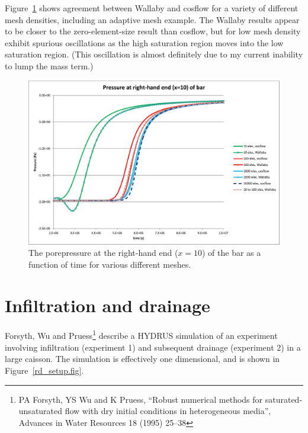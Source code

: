 \documentclass[]{scrreprt}
\begin{document}
Figure~\ref{uf.result.fig} shows agreement between Wallaby and
cosflow for a variety of different mesh densities, including an
adaptive mesh example.  The Wallaby results appear to be closer to the
zero-element-size result than cosflow, but for low mesh density
exhibit spurious oscillations as the high saturation region moves into
the low saturation region.  (This oscillation is almost definitely due
to my current inability to lump the mass term.)

\begin{figure}[htb]
\begin{center}
\includegraphics[width=17cm]{uf.eps}
\caption{The porepressure at the right-hand end ($x=10$) of the bar as
  a function of time for various different meshes.}
\label{uf.result.fig}
\end{center}
\end{figure}


\chapter{Infiltration and drainage}

Forsyth, Wu and Pruess\footnote{PA Forsyth, YS Wu and K Pruess,
  ``Robust numerical methods for saturated-unsaturated flow with dry
  initial conditions in heterogeneous media'', Advances in Water
  Resources 18 (1995) 25--38} describe a HYDRUS simulation of an
experiment involving infiltration (experiment 1) and subsequent
drainage (experiment 2) in a large caisson.  The simulation is
effectively one dimensional, and is shown in
Figure~\ref{rd_setup.fig}.
\end{document}
